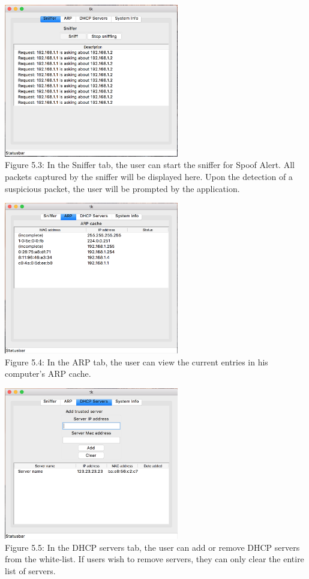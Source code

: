 \documentclass{acm_proc_article-sp}
\begin{document}
\includegraphics[width=3in]{architecture03.png} \\
Figure 5.3: In the Sniffer tab, the user can start the sniffer for Spoof Alert. All packets captured by the sniffer will be displayed here. Upon the detection of a suspicious packet, the user will be prompted by the application.

\includegraphics[width=3in]{architecture04.png} \\
Figure 5.4: In the ARP tab, the user can view the current entries in his computer’s ARP cache.

\includegraphics[width=3in]{architecture05.png} \\
Figure 5.5: In the DHCP servers tab, the user can add or remove DHCP servers from the white-list. If users wish to remove servers, they can only clear the entire list of servers. 
\end{document}
